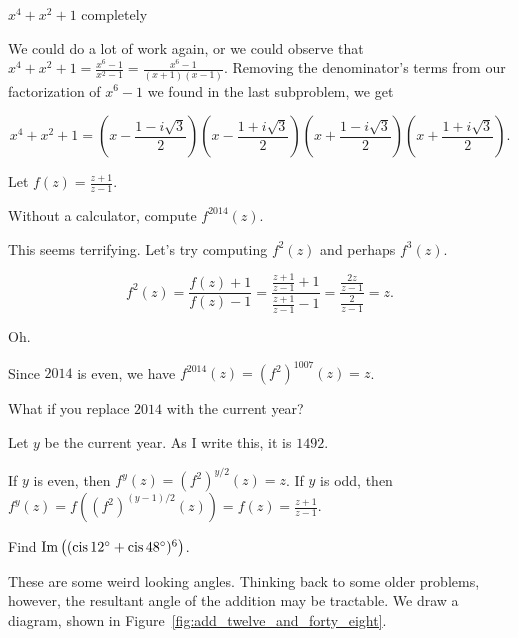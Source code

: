 \documentclass[../gatm_answers.tex]{subfiles}
\begin{document}
\begin{inner_problem}
\item $x^4+x^2+1$ completely
\end{inner_problem}

We could do a lot of work again, or we could observe that $x^4+x^2+1 = \frac{x^6 - 1}{x^2 - 1} = \frac{x^6 - 1}{(x+1)(x-1)}$. Removing the denominator's terms from our factorization of $x^6-1$ we found in the last subproblem, we get

$$x^4+x^2+1 = \left(x - \frac{1 - i\sqrt{3}}{2}\right) \left(x - \frac{1 + i\sqrt{3}}{2}\right)\left(x + \frac{1 - i\sqrt{3}}{2}\right) \left(x + \frac{1 + i\sqrt{3}}{2}\right).$$

\begin{outer_problem}
\item Let $f(z)=\frac{z+1}{z-1}$.
\end{outer_problem}

\begin{inner_problem}[start=1]
\item Without a calculator, compute $f^{2014}(z)$.
\end{inner_problem}

This seems terrifying. Let's try computing $f^2(z)$ and perhaps $f^3(z)$.

$$f^2(z) = \frac{f(z)+1}{f(z)-1} = \frac{\frac{z+1}{z-1}+1}{\frac{z+1}{z-1}-1} = \frac{\frac{2z}{z-1}}{\frac{2}{z-1}} = z.$$

Oh.

Since $2014$ is even, we have $f^{2014}(z) = (f^2)^{1007}(z) = z$.

\begin{inner_problem}
\item What if you replace $2014$ with the current year?
\end{inner_problem}

Let $y$ be the current year. As I write this, it is $1492$.

If $y$ is even, then $f^y(z) = (f^2)^{y/2}(z) = z$. If $y$ is odd, then $f^y(z) = f((f^2)^{(y-1)/2}(z)) = f(z) = \frac{z+1}{z-1}$.

\begin{outer_problem}
\item Find $\operatorname{Im}\left((\operatorname{cis} 12^\circ + \operatorname{cis} 48^\circ)^6\right)$.
\end{outer_problem}

These are some weird looking angles. Thinking back to some older problems, however, the resultant angle of the addition may be tractable. We draw a diagram, shown in Figure~\ref{fig:add_twelve_and_forty_eight}.
\end{document}
